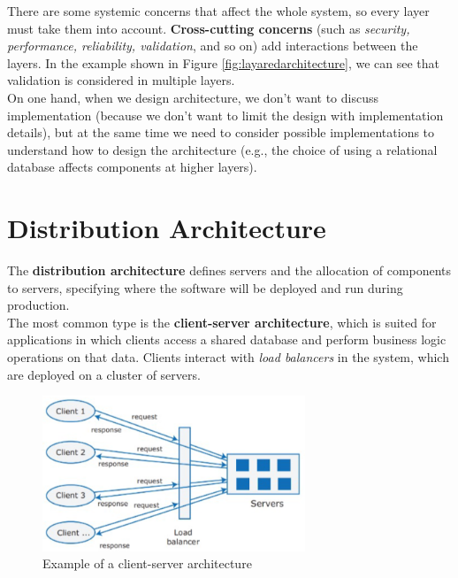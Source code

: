 There are some systemic concerns that affect the whole system, so every layer must take them into account. \textbf{Cross-cutting concerns} (such as \emph{security, performance, reliability, validation}, and so on) add interactions between the layers. In the example shown in Figure \ref{fig:layaredarchitecture}, we can see that validation is considered in multiple layers. \\

On one hand, when we design architecture, we don't want to discuss implementation (because we don't want to limit the design with implementation details), but at the same time we need to consider possible implementations to understand how to design the architecture (e.g., the choice of using a relational database affects components at higher layers).

\section{Distribution Architecture}

The \textbf{distribution architecture} defines servers and the allocation of components to servers, specifying where the software will be deployed and run during production. \\

The most common type is the \textbf{client-server architecture}, which is suited for applications in which clients access a shared database and perform business logic operations on that data. Clients interact with \emph{load balancers} in the system, which are deployed on a cluster of servers.

\begin{figure} [H]
    \centering
    \includegraphics[width=0.7\textwidth]{images/SoftwareArchitecture/clientserverarchitecture.png}
    \caption{Example of a client-server architecture}
    \label{fig:clientserverarchitecture}
\end{figure}

